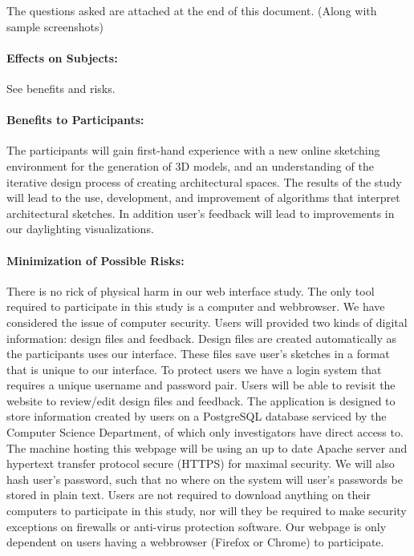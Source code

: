 \documentclass[12pt]{article}
\begin{document}
\noindent
The questions asked are attached at the end of this document. (Along with sample screenshots)

\paragraph{Effects on Subjects:} See benefits and risks.

\paragraph{Benefits to Participants:}
%
The participants will gain first-hand experience with a new online sketching
environment for the generation of 3D models, and an understanding of the 
iterative design process of creating architectural spaces. The results 
of the study will lead to the use, development, and improvement of algorithms that
interpret architectural sketches. In addition user's feedback will lead to 
improvements in our daylighting visualizations.


\paragraph{Minimization of Possible Risks:}   
% 
There is no rick of physical harm in our web interface study. 
The only tool required to participate in this study is a computer and webbrowser.
We have considered the issue of computer security. Users will provided two kinds 
of digital information: design files and feedback. 
Design files are created automatically as the participants uses our interface. 
These files save user's sketches in a format that is unique to our interface.
To protect users we have a login system that requires a unique username and password pair. Users will be able to
revisit the website to review/edit design files and feedback.
The application is designed to store information created by users on a PostgreSQL 
database serviced by the Computer Science Department, of which only investigators have direct access to.
The machine hosting this webpage will be using an up to date Apache server and hypertext transfer protocol secure (HTTPS)
for maximal security. We will also hash user's password, such that no where on the system will
user's passwords be stored in plain text.
Users are not required to download anything on their computers to participate in this study, nor will
they be required to make security exceptions on firewalls or anti-virus protection software.
Our webpage is only dependent on users having a webbrowser (Firefox or Chrome) to participate.
\end{document}
